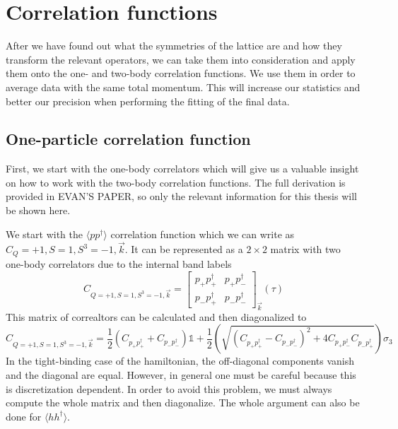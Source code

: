   
\section{Correlation functions}

After we have found out what the symmetries of the lattice are and how they transform the relevant operators, we can take them into consideration and apply them onto the one- and two-body correlation functions. We use them in order to average data with the same total momentum. This will increase our statistics and better our precision when performing the fitting of the final data.

\subsection{One-particle correlation function}

First, we start with the one-body correlators which will give us a valuable insight on how to work with the two-body correlation functions. The full derivation is provided in EVAN'S PAPER, so only the relevant information for this thesis will be shown here.

We start with the $\langle pp^\dagger\rangle$ correlation function which we can write as $C_Q=+1,S=1,S^3=-1,\vec{k}$. It can be represented as a $2\times 2$ matrix with two one-body correlators due to the internal band labels
\newcommand{\corp}[2]{p_{#1}p^\dagger_{#2}}
\begin{equation}
  C_{Q=+1,S=1,S^3=-1,\vec{k}} =
  \left[
  \begin{array}{cc}
    \corp{+}{+} & \corp{+}{-} \\
    \corp{-}{+} & \corp{-}{-}
  \end{array}
  \right] _{\vec{k}} (\tau)
\end{equation}
This matrix of correaltors can be calculated and then diagonalized to
\begin{equation}
  C_{Q=+1,S=1,S^3=-1,\vec{k}} = \frac{1}{2}\left(C_{\corp{+}{+}} + C_{\corp{-}{-}}\right)\mathds{1} + \frac{1}{2}\left(\sqrt{\left(C_{\corp{+}{+}} - C_{\corp{-}{-}}\right)^2 + 4 C_{\corp{+}{-}}C_{\corp{-}{+}}}\right)\sigma_3
\end{equation}
In the tight-binding case of the hamiltonian, the off-diagonal components vanish and the diagonal are equal. However, in general one must be careful because this is discretization dependent. In order to avoid this problem, we must always compute the whole matrix and then diagonalize. The whole argument can also be done for $\langle hh^\dagger\rangle$.

